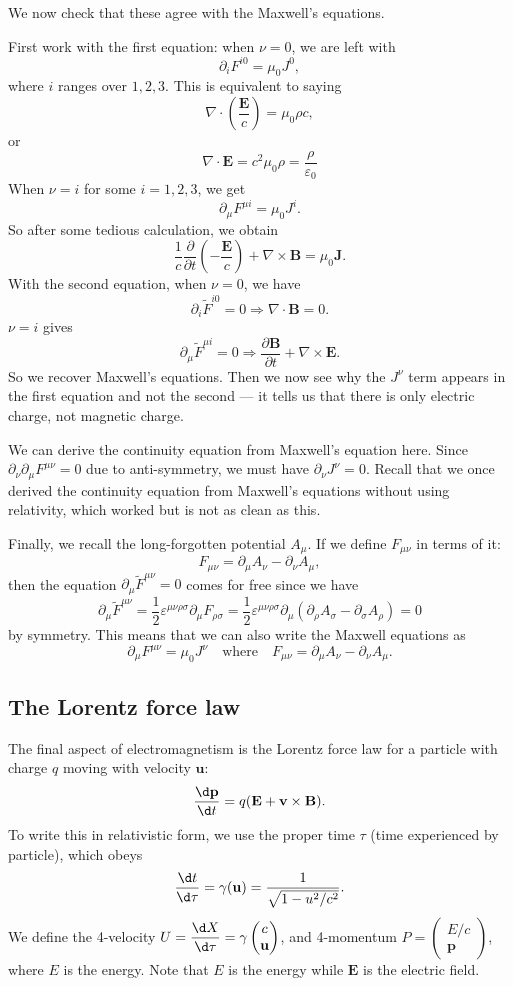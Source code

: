 \documentclass[a4paper]{article}
\begin{document}
We now check that these agree with the Maxwell's equations.

First work with the first equation: when $\nu = 0$, we are left with
\[
  \partial_i F^{i0} = \mu_0 J^0,
\]
where $i$ ranges over $1, 2, 3$. This is equivalent to saying
\[
  \nabla\cdot \left(\frac{\mathbf{E}}{c}\right) = \mu_0 \rho c,
\]
or
\[
  \nabla\cdot \mathbf{E} = c^2 \mu_0 \rho = \frac{\rho}{\varepsilon_0}
\]
When $\nu = i$ for some $i = 1, 2, 3$, we get
\[
  \partial _\mu F^{\mu i} = \mu_0 J^i.
\]
So after some tedious calculation, we obtain
\[
  \frac{1}{c}\frac{\partial}{\partial t}\left(-\frac{\mathbf{E}}{c}\right) + \nabla\times \mathbf{B} = \mu_0 \mathbf{J}.
\]
With the second equation, when $\nu = 0$, we have
\[
  \partial_i \tilde{F}^{i0} = 0 \Rightarrow \nabla\cdot \mathbf{B} = 0.
\]
$\nu = i$ gives
\[
  \partial_\mu \tilde{F}^{\mu i} = 0 \Rightarrow \frac{\partial \mathbf{B}}{\partial t} + \nabla\times \mathbf{E}.
\]
So we recover Maxwell's equations. Then we now see why the $J^\nu$ term appears in the first equation and not the second --- it tells us that there is only electric charge, not magnetic charge.

We can derive the continuity equation from Maxwell's equation here. Since $\partial_\nu\partial_\mu F^{\mu\nu} = 0$ due to anti-symmetry, we must have $\partial_\nu J^\nu = 0$. Recall that we once derived the continuity equation from Maxwell's equations without using relativity, which worked but is not as clean as this.

Finally, we recall the long-forgotten potential $A_\mu$. If we define $F_{\mu\nu}$ in terms of it:
\[
  F_{\mu\nu} = \partial_\mu A_\nu - \partial_\nu A_\mu,
\]
then the equation $\partial_\mu \tilde{F}^{\mu\nu} = 0$ comes for free since we have
\[
  \partial_\mu \tilde{F}^{\mu\nu} = \frac{1}{2}\varepsilon^{\mu\nu\rho\sigma}\partial_{\mu}F_{\rho\sigma} = \frac{1}{2} \varepsilon^{\mu\nu\rho\sigma}\partial_\mu(\partial_\rho A_\sigma - \partial_\sigma A_\rho) = 0
\]
by symmetry. This means that we can also write the Maxwell equations as
\[
  \partial_\mu F^{\mu\nu} = \mu_0 J^\nu\quad\text{where}\quad F_{\mu\nu} = \partial_\mu A_\nu - \partial_\nu A_\mu.
\]
\subsection{The Lorentz force law}
The final aspect of electromagnetism is the Lorentz force law for a particle with charge $q$ moving with velocity $\mathbf{u}$:
\[
  \frac{\d \mathbf{p}}{\d t} = q(\mathbf{E} + \mathbf{v}\times \mathbf{B}).
\]
To write this in relativistic form, we use the proper time $\tau$ (time experienced by particle), which obeys
\[
  \frac{\d t}{\d \tau} = \gamma(\mathbf{u}) = \frac{1}{\sqrt{1 - u^2/c^2}}.
\]
We define the 4-velocity $\displaystyle U = \frac{\d X}{\d \tau} = \gamma\begin{pmatrix}c\\ \mathbf{u}\end{pmatrix}$, and 4-momentum $P = \begin{pmatrix}E/c\\ \mathbf{p}\end{pmatrix}$, where $E$ is the energy. Note that $E$ is the energy while $\mathbf{E}$ is the electric field.
\end{document}
